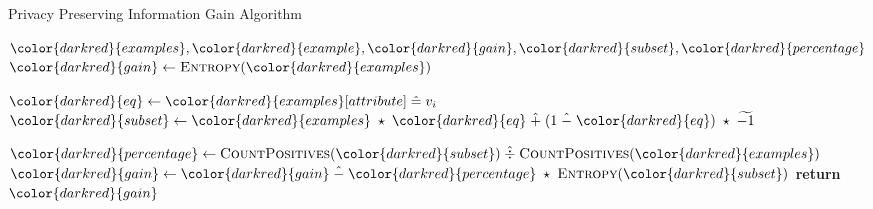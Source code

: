 \begin{algorithm}[H]
\caption{Privacy Preserving Information Gain Algorithm}\label{a:id3-gain-pp}
\begin{algorithmic}[1]
\Require ${\color{darkred}{examples}}, {\color{darkred}{example}}, {\color{darkred}{gain}}, {\color{darkred}{subset}}, {\color{darkred}{percentage}}$
    \State ${\color{darkred}{gain}} \gets \textsc{Entropy}({\color{darkred}{examples}})$

        \State ${\color{darkred}{eq}} \gets {\color{darkred}{examples}}[attribute] \heq v_i$ 
        \State ${\color{darkred}{subset}} \gets {\color{darkred}{examples}} \hmul {\color{darkred}{eq}} \hplus (1 \hminus {\color{darkred}{eq}}) \hmul \enc{-1} $ 

        \State ${\color{darkred}{percentage}} \gets \textsc{CountPositives}({\color{darkred}{subset}}) \hdiv \textsc{CountPositives}({\color{darkred}{examples}})$
        \State ${\color{darkred}{gain}} \gets {\color{darkred}{gain}} \hminus {\color{darkred}{percentage}} \hmul \textsc{Entropy}({\color{darkred}{subset}})$
    \EndFor
    \State \textbf{return} ${\color{darkred}{gain}}$
\EndProcedure
\end{algorithmic}
\end{algorithm}
